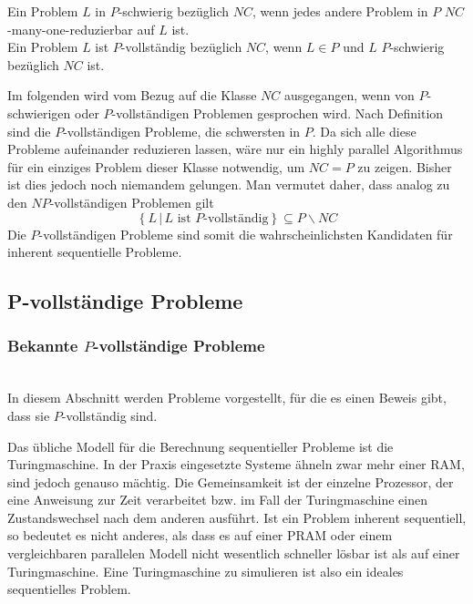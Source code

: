 \begin{define}
    Ein Problem $L$ in $P$-schwierig bezüglich $NC$, wenn jedes andere Problem
    in $P$ $NC$-many-one-reduzierbar auf $L$ ist. \\
    Ein Problem $L$ ist $P$-vollständig bezüglich $NC$, wenn $L \in P$ und $L$
    $P$-schwierig bezüglich $NC$ ist.
\end{define}
Im folgenden wird vom Bezug auf die Klasse $NC$ ausgegangen, wenn von
$P$-schwierigen oder $P$-vollständigen Problemen gesprochen wird.
%
Nach Definition sind die $P$-vollständigen Probleme, die schwersten in $P$.
Da sich alle diese Probleme aufeinander reduzieren lassen, wäre nur ein highly
parallel Algorithmus für ein einziges Problem dieser Klasse notwendig, um
$NC = P$ zu zeigen.
Bisher ist dies jedoch noch niemandem gelungen.
Man vermutet daher, dass analog zu den $NP$-vollständigen Problemen gilt
\begin{equation}
    \left\{ L \, | \, L \text{ ist $P$-vollständig} \right\} \subseteq P \backslash NC
\end{equation}
Die $P$-vollständigen Probleme sind somit die wahrscheinlichsten Kandidaten
für inherent sequentielle Probleme.
\cite[S.54ff]{greenlaw}\cite[S.535]{jaja}

\subsection{P-vollständige Probleme}

\subsubsection{Bekannte $P$-vollständige Probleme} \hfill \\
In diesem Abschnitt werden Probleme vorgestellt, für die es einen Beweis gibt,
dass sie $P$-vollständig sind.

Das übliche Modell für die Berechnung sequentieller Probleme ist die
Turingmaschine.
In der Praxis eingesetzte Systeme ähneln zwar mehr einer RAM, sind jedoch
genauso mächtig.
Die Gemeinsamkeit ist der einzelne Prozessor, der eine Anweisung zur Zeit
verarbeitet bzw. im Fall der Turingmaschine einen Zustandswechsel nach dem
anderen ausführt.
Ist ein Problem inherent sequentiell, so bedeutet es nicht anderes, als dass es
auf einer PRAM oder einem vergleichbaren parallelen Modell nicht wesentlich
schneller lösbar ist als auf einer Turingmaschine.
Eine Turingmaschine zu simulieren ist also ein ideales sequentielles Problem.

